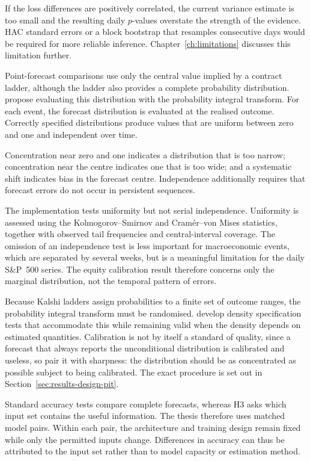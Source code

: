 \documentclass[12pt,a4paper]{report}
\begin{document}
If the loss differences are positively correlated, the current variance
estimate is too small and the resulting daily \(p\)-values overstate the
strength of the evidence. HAC standard errors or a block bootstrap that
resamples consecutive days would be required for more reliable inference.
Chapter~\ref{ch:limitations} discusses this limitation further.

Point-forecast comparisons use only the central value implied by a contract
ladder, although the ladder also provides a complete probability distribution.
\textcite{diebold1998} propose evaluating this distribution with the
probability integral transform. For each event, the forecast distribution is
evaluated at the realised outcome. Correctly specified distributions produce
values that are uniform between zero and one and independent over time.

Concentration near zero and one indicates a distribution that is too narrow;
concentration near the centre indicates one that is too wide; and a systematic
shift indicates bias in the forecast centre. Independence additionally
requires that forecast errors do not occur in persistent sequences.

The implementation tests uniformity but not serial independence. Uniformity is
assessed using the Kolmogorov--Smirnov and Cram\'er--von Mises statistics,
together with observed tail frequencies and central-interval coverage. The
omission of an independence test is less important for macroeconomic events,
which are separated by several weeks, but is a meaningful limitation for the
daily S\&P~500 series. The equity calibration result therefore concerns only
the marginal distribution, not the temporal pattern of errors.

Because Kalshi ladders assign probabilities to a finite set of outcome ranges,
the probability integral transform must be randomised. \textcite{rossi2019} develop
density specification tests that accommodate this while remaining valid when
the density depends on estimated quantities. Calibration is not by itself a
standard of quality, since a forecast that always reports the unconditional
distribution is calibrated and useless, so \textcite{gneiting2007} pair it
with sharpness: the distribution should be as concentrated as possible subject
to being calibrated. The exact procedure is set out in
Section~\ref{sec:results-design-pit}.

Standard accuracy tests compare complete forecasts, whereas H3 asks which
input set contains the useful information. The thesis therefore uses matched
model pairs. Within each pair, the architecture and training design remain
fixed while only the permitted inputs change. Differences in accuracy can thus
be attributed to the input set rather than to model capacity or estimation
method.
\end{document}
